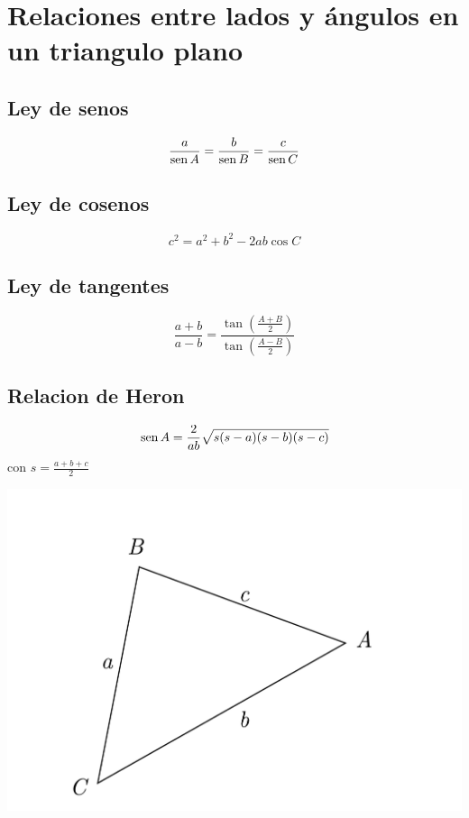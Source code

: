 \section*{Relaciones entre lados y ángulos en un triangulo plano}
\begin{minipage}[c]{0.5\textwidth}
\subsection*{Ley de senos}
$$\frac{a}{\operatorname{sen} A}=\frac{b}{\operatorname{sen} B}=\frac{c}{\operatorname{sen} C}$$
\subsection*{Ley de cosenos}
$$c^2=a^2+b^2-2ab\cos C$$
\subsection*{Ley de tangentes}
$$\frac{a+b}{a-b}=\frac{\tan \left( \frac{A+B}{2} \right)}{\tan \left( \frac{A-B}{2} \right)}$$

\subsection*{Relacion de Heron}
$$\operatorname{sen} A = \frac{2}{ab}\sqrt{s(s-a)(s-b)(s-c)}$$
con $s=\frac{a+b+c}{2}$
\end{minipage}
\begin{minipage}[c]{0.5\textwidth}
\includegraphics[scale=0.4]{figuras/pltriangle}
\end{minipage}

